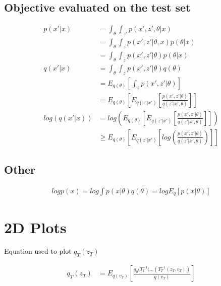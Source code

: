 \documentclass{article}
\begin{document}
\subsection{Objective evaluated on the test set}


\begin{align}
    p(x'|x) &= \int_{\theta} \int_{z'} p(x',z',\theta|x) \\
    &= \int_{\theta} \int_{z} p(x',z'|\theta,x) p(\theta|x) \\
    &= \int_{\theta} \int_{z} p(x',z'|\theta) p(\theta|x) \\
    q(x'|x) &= \int_{\theta} \int_{z} p(x',z'|\theta) q(\theta) \\
    &= E_{q(\theta)} \left[ \int_{z} p(x',z'|\theta) \right] \\
    &= E_{q(\theta)} \left[ E_{q(z'|x')} \left[ \frac{p(x',z'|\theta)}{q(z'|x',\theta)} \right] \right]  \\
	log(q(x'|x)) &= log \left(  E_{q(\theta)} \left[ E_{q(z'|x')} \left[ \frac{p(x',z'|\theta)}{q(z'|x',\theta)}  \right ] \right ] \right) \\
    &\geq   E_{q(\theta)} \left[ E_{q(z'|x')} \left[ log \left( \frac{p(x',z'|\theta)}{q(z'|x',\theta)} \right) \right ] \right ] 
\end{align}



\subsection{Other}


\begin{align}
    log p(x) = log \int p(x|\theta) q(\theta) = log E_q \left[ p(x|\theta) \right]
\end{align}




\section{2D Plots}

Equation used to plot $q_{T}(z_{T})$

\begin{align}
    q_{T}(z_{T}) &= E_{q(v_T)} \left[ \frac {q_{0}(T_{1}^{-1}(...(T_{T}^{-1}(z_{T},v_{T}))} { q(v_{T})}  \right ]
\end{align}
\end{document}
